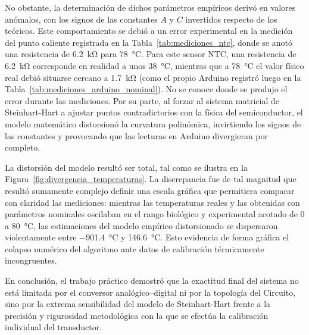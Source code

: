 \documentclass[10pt]{article}
\begin{document}
\vspace{0.3cm}

No obstante, la determinación de dichos parámetros empíricos derivó en valores anómalos, con los signos de las constantes $A$ y $C$ invertidos respecto de los teóricos. Este comportamiento se debió a un error experimental en la medición del punto caliente registrada en la Tabla~\ref{tab:mediciones_ntc}, donde se anotó una resistencia de \SI{6.2}{\kilo\ohm} para \SI{78}{\celsius}. Para este sensor NTC, una resistencia de \SI{6.2}{\kilo\ohm} corresponde en realidad a unos \SI{38}{\celsius}, mientras que a \SI{78}{\celsius} el valor físico real debió situarse cercano a \SI{1.7}{\kilo\ohm} (como el propio Arduino registró luego en la Tabla~\ref{tab:mediciones_arduino_nominal}). No se conoce donde se produjo el error durante las mediciones. Por su parte, al forzar al sistema matricial de Steinhart-Hart a ajustar puntos contradictorios con la física del semiconductor, el modelo matemático distorsionó la curvatura polinómica, invirtiendo los signos de las constantes y provocando que las lecturas en Arduino divergieran por completo.

\vspace{0.3cm}

La distorsión del modelo resultó ser total, tal como se ilustra en la Figura~\ref{fig:divergencia_temperaturas}. La discrepancia fue de tal magnitud que resultó sumamente complejo definir una escala gráfica que permitiera comparar con claridad las mediciones: mientras las temperaturas reales y las obtenidas con parámetros nominales oscilaban en el rango biológico y experimental acotado de 0 a \SI{80}{\celsius}, las estimaciones del modelo empírico distorsionado se dispersaron violentamente entre \SI{-901.4}{\celsius} y \SI{146.6}{\celsius}. Esto evidencia de forma gráfica el colapso numérico del algoritmo ante datos de calibración térmicamente incongruentes.
\vspace{0.3cm}

En conclusión, el trabajo práctico demostró que la exactitud final del sistema no está limitada por el conversor analógico--digital ni por la topología del Circuito, sino por la extrema sensibilidad del modelo de Steinhart-Hart frente a la precisión y rigurosidad metodológica con la que se efectúa la calibración individual del transductor.

%
\end{document}
